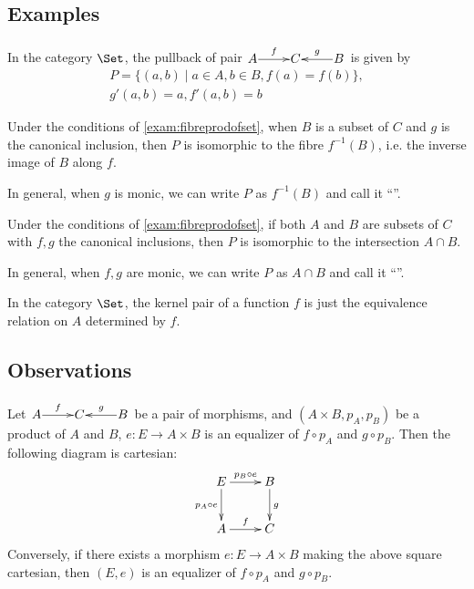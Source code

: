 \subsection{Examples}
  \begin{exam}\label{exam:fibreprodofset}
    In the category $\Set$, the pullback of pair $\xymatrix@1{A\ar[r]^{f}&C&B\ar[l]_{g}}$ is given by
    \begin{gather*}
      P=\{(a,b)\mid a\in A, b\in B, f(a)=f(b)\},\\
      g'(a,b)=a,f'(a,b)=b
    \end{gather*}
  \end{exam}
  \begin{exam}
    Under the conditions of \ref{exam:fibreprodofset}, when $B$ is a subset of $C$ and $g$ is the canonical inclusion, then $P$ is isomorphic to the fibre $f^{-1}(B)$, i.e. the inverse image of $B$ along $f$.
  \end{exam}
  \begin{rem}
    In general, when $g$ is monic, we can write $P$ as $f^{-1}(B)$ and call it ``''.
  \end{rem}
  \begin{exam}\label{exam:intersection=pullback}
    Under the conditions of \ref{exam:fibreprodofset}, if both $A$ and $B$ are subsets of $C$ with $f,g$ the canonical inclusions, then $P$ is isomorphic to the intersection $A\cap B$.
  \end{exam}
  \begin{rem}
    In general, when $f,g$ are monic, we can write $P$ as $A\cap B$ and call it ``''.
  \end{rem}
  \begin{exam}
    In the category $\Set$, the kernel pair of a function $f$ is just the equivalence relation on $A$ determined by $f$.
  \end{exam}
\subsection{Observations}
  \begin{ex}\label{prop:pullback=eq+prod}
    Let $\xymatrix@1{A\ar[r]^{f}&C&B\ar[l]_{g}}$ be a pair of morphisms, and $(A\times B, p_A, p_B)$ be a product of $A$ and $B$, $e\colon E\to A\times B$ is an equalizer of $f\circ p_A$ and $g\circ p_B$. Then the following diagram is cartesian:
    \begin{displaymath}
      \xymatrix{
         E\ar[r]^{p_B\circ e}\ar[d]_{p_A\circ e}&B\ar[d]^{g}\\
         A\ar[r]^{f}&C
      }
    \end{displaymath}
    Conversely, if there exists a morphism $e\colon E\to A\times B$ making the above square cartesian, then $(E,e)$ is an equalizer of $f\circ p_A$ and $g\circ p_B$.
  \end{ex}

